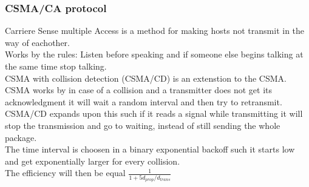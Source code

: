 \documentclass[12pt, a4paper]{article}
\begin{document}
			\subsubsection{CSMA/CA protocol}
				Carriere Sense multiple Access is a method for making hosts not transmit in the way of eachother.\\
				Works by the rules: Listen before speaking and if someone else begins talking at the same time stop talking.\\
				CSMA with collision detection (CSMA/CD) is an extenstion to the CSMA.\\
				CSMA works by in case of a collision and a transmitter does not get its acknowledgment it will wait a random interval and then try to retransmit.\\
				CSMA/CD expands upon this such if it reads a signal while transmitting it will stop the transmission and go to waiting, instead of still sending the whole package.\\
				The time interval is choosen in a binary exponential backoff such it starts low and get exponentially larger for every collision.\\
				The efficiency will then be equal $\frac{1}{1+5d_{prop}/d_{trans}}$
\end{document}
